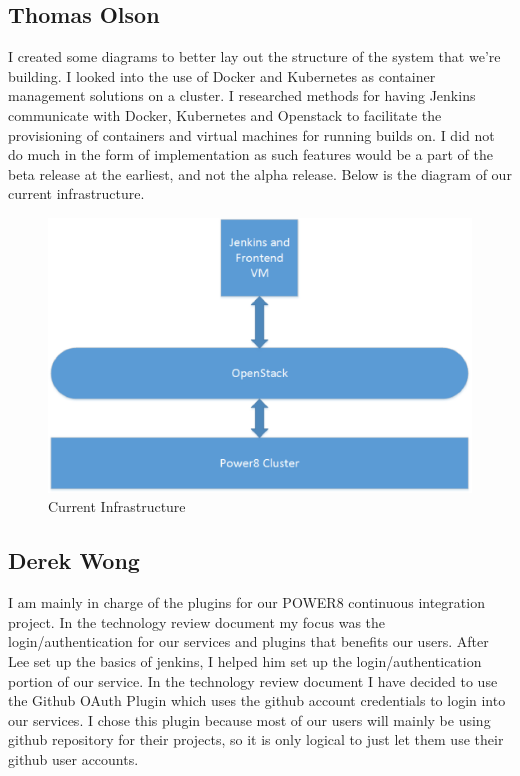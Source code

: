 \documentclass[10pt,onecolumn,journal,draftclsnofoot]{IEEEtran}
\begin{document}
\subsection{Thomas Olson}
I created some diagrams to better lay out the structure of the system that we're building. I looked into the use of Docker and Kubernetes as container management solutions on a cluster. I researched methods for having Jenkins communicate with Docker, Kubernetes and Openstack to facilitate the provisioning of containers and virtual machines for running builds on. I did not do much in the form of implementation as such features would be a part of the beta release at the earliest, and not the alpha release. Below is the diagram of our current infrastructure.

\begin{figure}[H]
  \centering
  \includegraphics[width=\textwidth, keepaspectratio]{Current_Infrastructure.eps}
  \caption{Current Infrastructure}
\end{figure}
\subsection{Derek Wong}
I am mainly in charge of the plugins for our POWER8 continuous integration project. In the technology review document my focus was the login/authentication for our services and plugins that benefits our users. After Lee set up the basics of jenkins, I helped him set up the login/authentication portion of our service. In the technology review document I have decided to use the Github OAuth Plugin which uses the github account credentials to login into our services. I chose this plugin because most of our users will mainly be using github repository for their projects, so it is only logical to just let them use their github user accounts.
\end{document}
